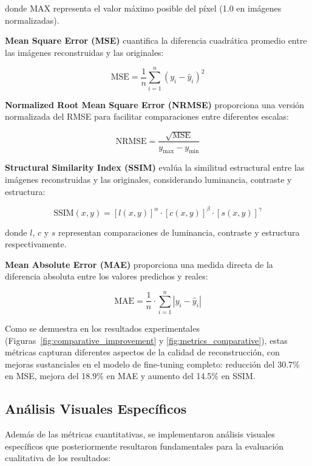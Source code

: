 donde MAX representa el valor máximo posible del píxel (1.0 en imágenes normalizadas).

\textbf{Mean Square Error (MSE)} cuantifica la diferencia cuadrática promedio entre las imágenes reconstruidas y las originales:

\begin{equation}
\text{MSE} = \frac{1}{n} \sum_{i=1}^{n}(y_i - \hat{y}_i)^2
\end{equation}

\textbf{Normalized Root Mean Square Error (NRMSE)} proporciona una versión normalizada del RMSE para facilitar comparaciones entre diferentes escalas:

\begin{equation}
\text{NRMSE} = \frac{\sqrt{\text{MSE}}}{y_{\max} - y_{\min}}
\end{equation}

\textbf{Structural Similarity Index (SSIM)} evalúa la similitud estructural entre las imágenes reconstruidas y las originales, considerando luminancia, contraste y estructura:

\begin{equation}
\text{SSIM}(x,y) = [l(x,y)]^{\alpha} \cdot [c(x,y)]^{\beta} \cdot [s(x,y)]^{\gamma}
\end{equation}

donde $l$, $c$ y $s$ representan comparaciones de luminancia, contraste y estructura respectivamente.

\textbf{Mean Absolute Error (MAE)} proporciona una medida directa de la diferencia absoluta entre los valores predichos y reales:

\begin{equation}
\text{MAE} = \frac{1}{n} \cdot \sum_{i=1}^{n}|y_i - \hat{y}_i|
\end{equation}

Como se demuestra en los resultados experimentales (Figuras~\ref{fig:comparative_improvement} y \ref{fig:metrics_comparative}), estas métricas capturan diferentes aspectos de la calidad de reconstrucción, con mejoras sustanciales en el modelo de fine-tuning completo: reducción del 30.7\% en MSE, mejora del 18.9\% en MAE y aumento del 14.5\% en SSIM.

\subsection{Análisis Visuales Específicos}

Además de las métricas cuantitativas, se implementaron análisis visuales específicos que posteriormente resultaron fundamentales para la evaluación cualitativa de los resultados:

